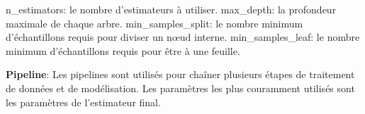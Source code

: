 n\+\_\+estimators\+: le nombre d’estimateurs à utiliser. max\+\_\+depth\+: la profondeur maximale de chaque arbre. min\+\_\+samples\+\_\+split\+: le nombre minimum d’échantillons requis pour diviser un nœud interne. min\+\_\+samples\+\_\+leaf\+: le nombre minimum d’échantillons requis pour être à une feuille.


\begin{DoxyEnumerate}
\item {\bfseries Pipeline}\+: Les pipelines sont utilisés pour chaîner plusieurs étapes de traitement de données et de modélisation. Les paramètres les plus couramment utilisés sont les paramètres de l’estimateur final. 
\end{DoxyEnumerate}
